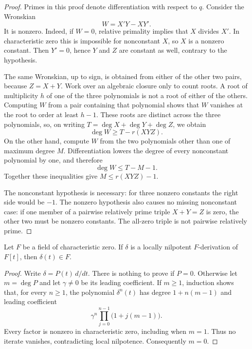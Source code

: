 \begin{proof}
Primes in this proof denote differentiation with respect to $q$.
Consider the Wronskian
\[
 W=X'Y-XY'.
\]
It is nonzero.  Indeed, if $W=0$, relative primality implies that
$X$ divides $X'$.  In characteristic zero this is impossible for
nonconstant $X$, so $X$ is a nonzero constant.  Then $Y'=0$, hence
$Y$ and $Z$ are constant as well, contrary to the hypothesis.

The same Wronskian, up to sign, is obtained from either of the
other two pairs, because $Z=X+Y$.  Work over an algebraic closure
only to count roots.  A root of multiplicity $h$ of one of the
three polynomials is not a root of either of the others.  Computing
$W$ from a pair containing that polynomial shows that $W$ vanishes
at the root to order at least $h-1$.  These roots are distinct
across the three polynomials, so, on writing
$T=\deg X+\deg Y+\deg Z$, we obtain
\[
 \deg W\ge T-r(XYZ).
\]
On the other hand, compute $W$ from the two polynomials other
than one of maximum degree $M$.  Differentiation lowers the degree
of every nonconstant polynomial by one, and therefore
\[
 \deg W\le T-M-1.
\]
Together these inequalities give $M\le r(XYZ)-1$.

The nonconstant hypothesis is necessary: for three nonzero
constants the right side would be $-1$.  The nonzero hypothesis
also causes no missing nonconstant case: if one member of a
pairwise relatively prime triple $X+Y=Z$ is zero, the other two
must be nonzero constants.  The all-zero triple is not pairwise
relatively prime.
\end{proof}

\begin{lemma}\label{rig:one-variable}
Let $F$ be a field of characteristic zero.  If $\delta$ is a locally
nilpotent $F$-derivation of $F[t]$, then $\delta(t)\in F$.
\end{lemma}

\begin{proof}
Write $\delta=P(t)\,d/dt$.  There is nothing to prove if $P=0$.
Otherwise let $m=\deg P$ and let $\gamma\ne0$ be its leading
coefficient.  If $m\ge1$, induction shows that, for every $n\ge1$,
the polynomial $\delta^n(t)$ has degree $1+n(m-1)$ and leading
coefficient
\[
 \gamma^n\prod_{j=0}^{n-1}\bigl(1+j(m-1)\bigr).
\]
Every factor is nonzero in characteristic zero, including when
$m=1$.  Thus no iterate vanishes, contradicting local nilpotence.
Consequently $m=0$.
\end{proof}

